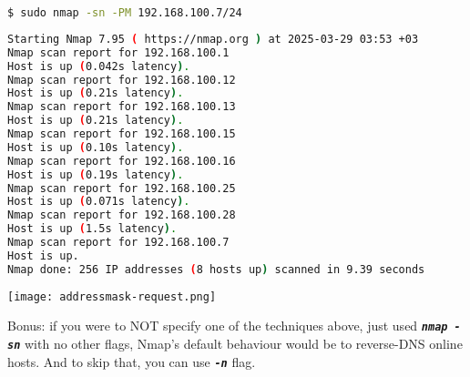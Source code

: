 \documentclass[11pt,a4paper]{article}
\newenvironment{commandbox}[1][]{
  \begin{tcolorbox}[
      colback=kalibackground,
      colframe=commandcolor,
      fonttitle=\bfseries\color{white},
      title=#1,
      breakable=true
    ]
  }{
  \end{tcolorbox}
}
\begin{document}
\begin{commandbox}[ICMP Address Mask Scan (-PM)]
\begin{lstlisting}[language=bash, style=bash, basicstyle=\small\ttfamily\color{warningcolor}]
$ sudo nmap -sn -PM 192.168.100.7/24
\end{lstlisting}

\begin{lstlisting}[basicstyle=\small\ttfamily\color{kalitext}, language=bash, style=bash, breaklines=true, breakindent=0pt]
Starting Nmap 7.95 ( https://nmap.org ) at 2025-03-29 03:53 +03
Nmap scan report for 192.168.100.1
Host is up (0.042s latency).
Nmap scan report for 192.168.100.12
Host is up (0.21s latency).
Nmap scan report for 192.168.100.13
Host is up (0.21s latency).
Nmap scan report for 192.168.100.15
Host is up (0.10s latency).
Nmap scan report for 192.168.100.16
Host is up (0.19s latency).
Nmap scan report for 192.168.100.25
Host is up (0.071s latency).
Nmap scan report for 192.168.100.28
Host is up (1.5s latency).
Nmap scan report for 192.168.100.7
Host is up.
Nmap done: 256 IP addresses (8 hosts up) scanned in 9.39 seconds
\end{lstlisting}
\end{commandbox}
\begin{center}
  \texttt{[image: addressmask-request.png]}
  \label{fig:addressmask-request}
\end{center}

\vspace{1em}
\begin{tcolorbox}[colback=codebackground, colframe=warningcolor]
  Bonus: if you were to NOT specify one of the techniques above, just
  used \texttt{\textit{\textbf{nmap -sn}}} with no other flags,
  Nmap's default behaviour would be to reverse-DNS online hosts. And
  to skip that, you can use \texttt{\textit{\textbf{-n}}} flag.
\end{tcolorbox}
\clearpage

\label{before-tcp-udp-discovery}

\clearpage  %


\end{document}
